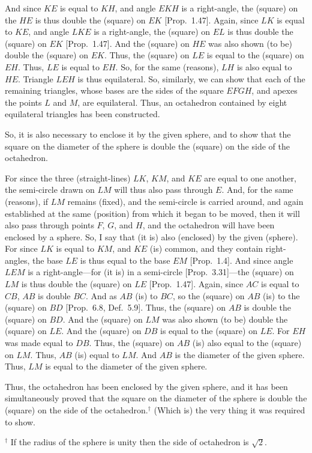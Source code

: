 \begin{Parallel}{}{}
{\epsfysize=3.25in
\centerline{}

And since  $KE$ is equal to $KH$, and angle $EKH$ is a right-angle, 
the (square) on the  $HE$ is thus double the (square) on $EK$ [Prop.~1.47].
Again, since $LK$ is equal to $KE$, and angle $LKE$
is a right-angle, the (square) on $EL$ is thus double the (square) on
$EK$ [Prop.~1.47]. And the (square) on $HE$ was also shown (to be)
double the (square) on $EK$.  Thus, the (square) on $LE$
is equal to the (square) on $EH$. Thus, $LE$ is equal to $EH$. So,
for the same (reasons), $LH$ is also equal to $HE$. Triangle
$LEH$ is thus equilateral. So, similarly, we can show that each of
the remaining triangles, whose bases are the sides of the
square $EFGH$, and apexes the points $L$ and $M$, are equilateral.
Thus, an octahedron contained by eight
equilateral triangles has been constructed.

So, it is also necessary to enclose it by the given sphere, and to show that the
square on the diameter of the sphere is double the (square) on the
side of the octahedron.

For since the three (straight-lines) $LK$, $KM$, and $KE$ are equal
to one another, the semi-circle drawn on $LM$ will thus also pass
through $E$. And, for the same (reasons), if $LM$ remains (fixed), and the semi-circle is carried around, and again established at the same
(position) from which it began to be moved, then it will also pass
through points $F$, $G$, and $H$, and the octahedron will have been
enclosed by a sphere. So, I say that (it is) also (enclosed)
by the given (sphere). For since $LK$ is equal to $KM$, and $KE$
(is) common, and they contain right-angles, the base
$LE$ is thus equal to the base $EM$ [Prop.~1.4]. And since angle $LEM$
is a right-angle---for (it is) in a semi-circle [Prop.~3.31]---the
(square) on $LM$ is thus double the (square) on $LE$ [Prop.~1.47]. 
Again, since $AC$ is equal to $CB$, $AB$ is double $BC$. 
And as $AB$ (is) to $BC$, so the (square) on $AB$ (is) to the
(square) on $BD$ [Prop.~6.8, Def.~5.9]. Thus, the (square) on 
$AB$ is double the (square) on $BD$. And the (square) on $LM$
was also shown (to be) double the (square) on $LE$. And the (square)
on $DB$ is equal to the (square) on $LE$. For $EH$ was made equal
to $DB$. Thus, the (square) on $AB$ (is) also equal to the (square) on 
$LM$. Thus, $AB$ (is) equal to $LM$. And $AB$ is the diameter of the
given sphere. Thus, $LM$ is equal to the diameter of the given sphere.

Thus, the octahedron has been enclosed by the given sphere,  and it has
been simultaneously  proved that the square on the diameter of the sphere
is double the (square) on the side of the octahedron.$^\dag$ (Which is) the
very thing it was required to show.}
\end{Parallel}
{\footnotesize\noindent$^\dag$ If the radius of the sphere is unity then the
side of octahedron is $\sqrt{2}$.}

